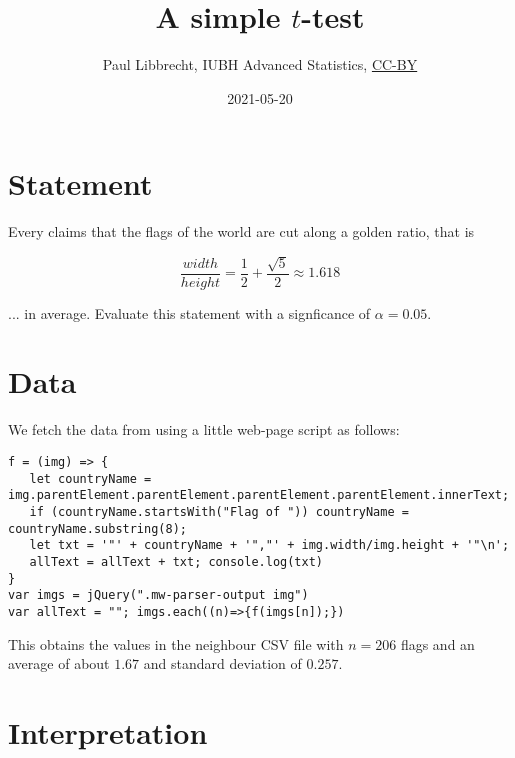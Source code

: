 \documentclass{article}
\begin{document}
\title{A simple $t$-test}
\date{2021-05-20}

\author{Paul Libbrecht, IUBH Advanced Statistics, \href{https://creativecommons.org/licenses/by/4.0/}{CC-BY}}
\maketitle




\section{Statement}

Every claims that the flags of the world are cut along a golden ratio, that is 

$$ \frac{width}{height} = \frac{1}{2} + \frac{\sqrt{5}}{2} \approx 1.618$$

... in average. Evaluate this statement with a signficance of $\alpha = 0.05$.


\section{Data}

We fetch the data from \cite{Wikipedia-flags} using a little web-page 
script as follows:

\begin{verbatim}
f = (img) => { 
   let countryName = img.parentElement.parentElement.parentElement.parentElement.innerText; 
   if (countryName.startsWith("Flag of ")) countryName = countryName.substring(8); 
   let txt = '"' + countryName + '","' + img.width/img.height + '"\n'; 
   allText = allText + txt; console.log(txt)
}
var imgs = jQuery(".mw-parser-output img")
var allText = ""; imgs.each((n)=>{f(imgs[n]);})
\end{verbatim}

This obtains the values in the neighbour CSV file with $n=206$ flags and an average of about $1.67$ and standard deviation 
of $0.257$.


\section{Interpretation}
\end{document}

